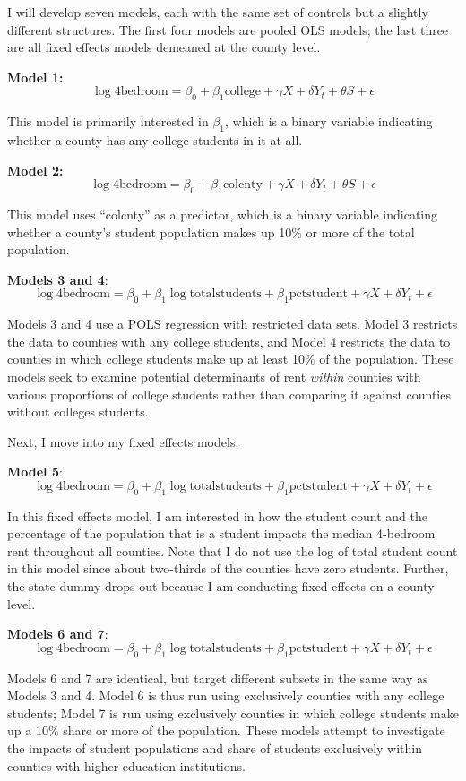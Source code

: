 \documentclass[12pt,english]{article}
\begin{document}
I will develop seven models, each with the same set of controls but a slightly different structures. The first four models are pooled OLS models; the last three are all fixed effects models demeaned at the county level.


\textbf{Model 1:} $$\log\text{4bedroom} = \beta_0 + \beta_1\text{college} + \gamma X + \delta Y_t + \theta S + \epsilon$$

This model is primarily interested in $\beta_1$, which is a binary variable indicating whether a county has any college students in it at all. 

\textbf{Model 2:} $$\log\text{4bedroom} = \beta_0 + \beta_1\text{colcnty} + \gamma X + \delta Y_t + \theta S + \epsilon$$

This model uses ``colcnty'' as a predictor, which is a binary variable indicating whether a county's student population makes up 10\% or more of the total population. 

\textbf{Models 3 and 4}: $$\log\text{4bedroom} = \beta_0 + \beta_1\log\text{totalstudents} + \beta_1\text{pctstudent} + \gamma X + \delta Y_t + \epsilon$$

Models 3 and 4 use a POLS regression with restricted data sets. Model 3 restricts the data to counties with any college students, and Model 4 restricts the data to counties in which college students make up at least 10\% of the population. These models seek to examine potential determinants of rent \textit{within} counties with various proportions of college students rather than comparing it against counties without colleges students. 

Next, I move into my fixed effects models.

\textbf{Model 5}: $$\log\text{4bedroom} = \beta_0 + \beta_1\log\text{totalstudents} + \beta_1\text{pctstudent} + \gamma X + \delta Y_t + \epsilon$$


In this fixed effects model, I am interested in how the student count and the percentage of the population that is a student impacts the median 4-bedroom rent throughout all counties. Note that I do not use the log of total student count in this model since about two-thirds of the counties have zero students. Further, the state dummy drops out because I am conducting fixed effects on a county level. 

\textbf{Models 6 and 7}: $$\log\text{4bedroom} = \beta_0 + \beta_1\log\text{totalstudents} + \beta_1\text{pctstudent} + \gamma X + \delta Y_t + \epsilon$$

Models 6 and 7 are identical, but target different subsets in the same way as Models 3 and 4. Model 6 is thus run using exclusively counties with any college students; Model 7 is run using exclusively counties in which college students make up a 10\% share or more of the population. These models attempt to investigate the impacts of student populations and share of students exclusively within counties with higher education institutions. 
\end{document}
